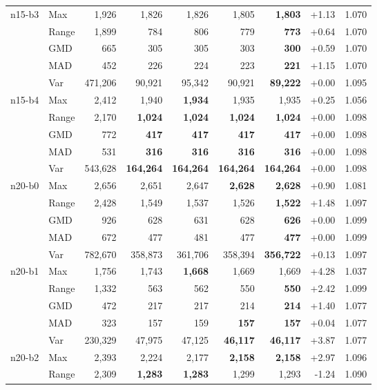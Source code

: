 \begin{small}
\begin{longtable}{llrrrrrrr}
n15-b3 & Max & 1,926 & 1,826 & 1,826 & 1,805 & \textbf{1,803} & +1.13 & 1.070 \\
 & Range & 1,899 & 784 & 806 & 779 & \textbf{773} & +0.64 & 1.070 \\
 & GMD & 665 & 305 & 305 & 303 & \textbf{300} & +0.59 & 1.070 \\
 & MAD & 452 & 226 & 224 & 223 & \textbf{221} & +1.15 & 1.070 \\
 & Var & 471,206 & 90,921 & 95,342 & 90,921 & \textbf{89,222} & +0.00 & 1.095 \\
n15-b4 & Max & 2,412 & 1,940 & \textbf{1,934} & 1,935 & 1,935 & +0.25 & 1.056 \\
 & Range & 2,170 & \textbf{1,024} & \textbf{1,024} & \textbf{1,024} & \textbf{1,024} & +0.00 & 1.098 \\
 & GMD & 772 & \textbf{417} & \textbf{417} & \textbf{417} & \textbf{417} & +0.00 & 1.098 \\
 & MAD & 531 & \textbf{316} & \textbf{316} & \textbf{316} & \textbf{316} & +0.00 & 1.098 \\
 & Var & 543,628 & \textbf{164,264} & \textbf{164,264} & \textbf{164,264} & \textbf{164,264} & +0.00 & 1.098 \\
n20-b0 & Max & 2,656 & 2,651 & 2,647 & \textbf{2,628} & \textbf{2,628} & +0.90 & 1.081 \\
 & Range & 2,428 & 1,549 & 1,537 & 1,526 & \textbf{1,522} & +1.48 & 1.097 \\
 & GMD & 926 & 628 & 631 & 628 & \textbf{626} & +0.00 & 1.099 \\
 & MAD & 672 & 477 & 481 & 477 & \textbf{477} & +0.00 & 1.099 \\
 & Var & 782,670 & 358,873 & 361,706 & 358,394 & \textbf{356,722} & +0.13 & 1.097 \\
n20-b1 & Max & 1,756 & 1,743 & \textbf{1,668} & 1,669 & 1,669 & +4.28 & 1.037 \\
 & Range & 1,332 & 563 & 562 & 550 & \textbf{550} & +2.42 & 1.099 \\
 & GMD & 472 & 217 & 217 & 214 & \textbf{214} & +1.40 & 1.077 \\
 & MAD & 323 & 157 & 159 & \textbf{157} & \textbf{157} & +0.04 & 1.077 \\
 & Var & 230,329 & 47,975 & 47,125 & \textbf{46,117} & \textbf{46,117} & +3.87 & 1.077 \\
n20-b2 & Max & 2,393 & 2,224 & 2,177 & \textbf{2,158} & \textbf{2,158} & +2.97 & 1.096 \\
 & Range & 2,309 & \textbf{1,283} & \textbf{1,283} & 1,299 & 1,293 & -1.24 & 1.090 \\

\end{longtable}
\end{small}
